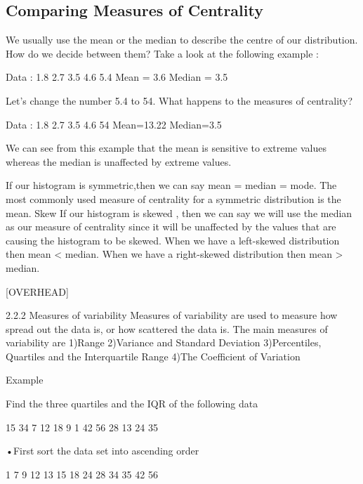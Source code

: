 \documentclass[]{report}
\begin{document}
 

\subsection{Comparing Measures of Centrality}

We usually use the mean or the median to describe the centre of our distribution. How do we decide between them? Take a look at the following example :

Data  :    1.8   2.7   3.5   4.6   5.4
Mean = 3.6                Median = 3.5

Let’s change the number 5.4 to 54. What happens to the measures of centrality?

Data :  1.8    2.7   3.5   4.6   54
Mean=13.22              Median=3.5

We can see from this example that the mean is sensitive to extreme values whereas the median is unaffected by extreme values.

If our histogram is symmetric,then we can say 
mean = median = mode. 
The most commonly used measure of centrality for a symmetric distribution is the mean.
Skew
If our histogram is skewed , then we can say we will use the median as our measure of centrality since it will be unaffected by the values that are causing the histogram to be skewed.
When we have a left-skewed distribution   then 
mean < median. 
When we have a right-skewed distribution then 
mean > median.

[OVERHEAD]


 

2.2.2 Measures of variability
Measures of variability are used to measure how spread out the data is, or how scattered the data is. The main measures of variability are
1)Range
2)Variance and Standard Deviation
3)Percentiles, Quartiles and the Interquartile Range
4)The Coefficient of Variation













Example

Find the three quartiles and the IQR of the following data

 15  34  7  12  18  9  1  42  56  28  13  24  35

•First sort the data set into ascending order

1 7  9 12 13 15 18  24 28 34 35 42 56
\end{document}
